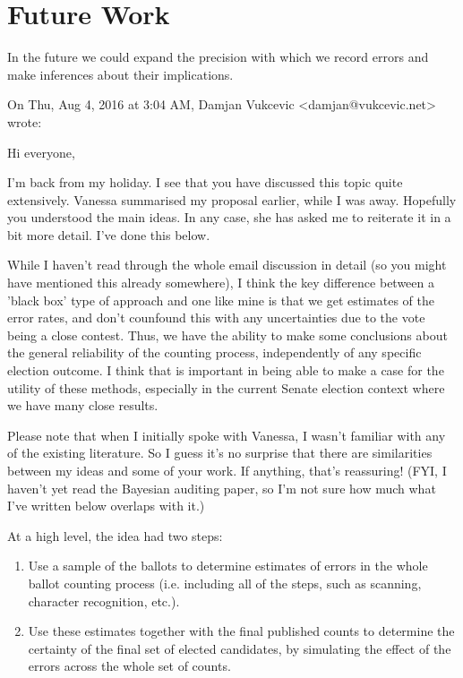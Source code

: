 \documentclass[10pt,a4paper]{article}
\newcommand{\longVersion}[1]{#1}
\newcommand{\longVersion}[1]{}
\begin{document}
\longVersion{
\section{Future Work}
In the future we could expand the precision with which we record errors and make inferences about their implications.


On Thu, Aug 4, 2016 at 3:04 AM, Damjan Vukcevic <damjan@vukcevic.net> wrote:


    Hi everyone,

    I'm back from my holiday.  I see that you have discussed this topic quite extensively.  Vanessa summarised my proposal earlier, while I was away.  Hopefully you understood the main ideas.  In any case, she has asked me to reiterate it in a bit more detail.  I've done this below.

    While I haven't read through the whole email discussion in detail (so you might have mentioned this already somewhere), I think the key difference between a 'black box' type of approach and one like mine is that we get estimates of the error rates, and don't counfound this with any uncertainties due to the vote being a close contest.  Thus, we have the ability to make some conclusions about the general reliability of the counting process, independently of any specific election outcome.  I think that is important in being able to make a case for the utility of these methods, especially in the current Senate election context where we have many close results.

    Please note that when I initially spoke with Vanessa, I wasn't familiar with any of the existing literature.  So I guess it's no surprise that there are similarities between my ideas and some of your work.  If anything, that's reassuring!  (FYI, I haven't yet read the Bayesian auditing paper, so I'm not sure how much what I've written below overlaps with it.)



    At a high level, the idea had two steps:

\begin{enumerate}
\item Use a sample of the ballots to determine estimates of errors in the whole ballot counting process (i.e. including all of the steps, such as scanning, character recognition, etc.).  \label{sample}

\item Use these estimates together with the final published counts to determine the certainty of the final set of elected candidates, by simulating the effect of the errors across the whole set of counts.  \label{useEstimates}
\end{enumerate}


}
\end{document}
